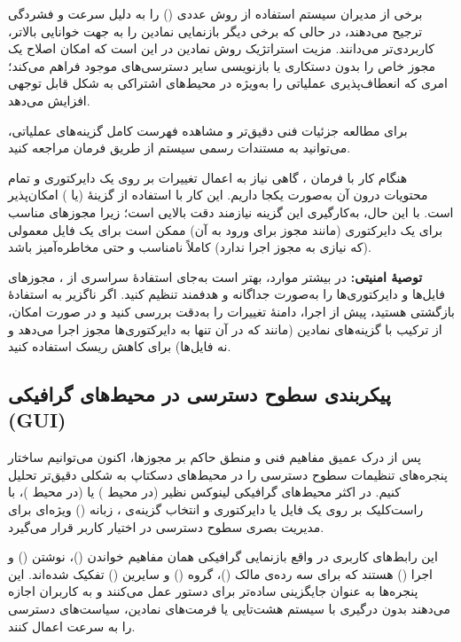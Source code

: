 برخی از مدیران سیستم استفاده از روش عددی () را به دلیل سرعت و فشردگی ترجیح می‌دهند، در حالی که برخی دیگر بازنمایی نمادین را به جهت خوانایی بالاتر، کاربردی‌تر می‌دانند. مزیت استراتژیک روش نمادین در این است که امکان اصلاح یک مجوز خاص را بدون دستکاری یا بازنویسی سایر دسترسی‌های موجود فراهم می‌کند؛ امری که انعطاف‌پذیری عملیاتی را به‌ویژه در محیط‌های اشتراکی به شکل قابل توجهی افزایش می‌دهد.

برای مطالعه جزئیات فنی دقیق‌تر و مشاهده فهرست کامل گزینه‌های عملیاتی، می‌توانید به مستندات رسمی سیستم از طریق فرمان  مراجعه کنید.

هنگام کار با فرمان ، گاهی نیاز به اعمال تغییرات بر روی یک دایرکتوری و تمام محتویات درون آن به‌صورت یکجا داریم. این کار با استفاده از گزینهٔ  (یا ) امکان‌پذیر است. با این حال، به‌کارگیری این گزینه نیازمند دقت بالایی است؛ زیرا مجوزهای مناسب برای یک دایرکتوری (مانند مجوز  برای ورود به آن) ممکن است برای یک فایل معمولی (که نیازی به مجوز اجرا ندارد) کاملاً نامناسب و حتی مخاطره‌آمیز باشد.

\textbf{توصیهٔ امنیتی:} در بیشتر موارد، بهتر است به‌جای استفادهٔ سراسری از ، مجوزهای فایل‌ها و دایرکتوری‌ها را به‌صورت جداگانه و هدفمند تنظیم کنید. اگر ناگزیر به استفادهٔ بازگشتی هستید، پیش از اجرا، دامنهٔ تغییرات را به‌دقت بررسی کنید و در صورت امکان، از ترکیب  با گزینه‌های نمادین (مانند  که در آن  تنها به دایرکتوری‌ها مجوز اجرا می‌دهد و نه فایل‌ها) برای کاهش ریسک استفاده کنید.

\subsection{پیکربندی سطوح دسترسی در محیط‌های گرافیکی (GUI)}

پس از درک عمیق مفاهیم فنی و منطق حاکم بر مجوزها، اکنون می‌توانیم ساختار پنجره‌های تنظیمات سطوح دسترسی را در محیط‌های دسکتاپ به شکلی دقیق‌تر تحلیل کنیم. در اکثر محیط‌های گرافیکی لینوکس نظیر  (در محیط ) یا  (در محیط )، با راست‌کلیک بر روی یک فایل یا دایرکتوری و انتخاب گزینه‌ی ، زبانه () ویژه‌ای برای مدیریت بصری سطوح دسترسی در اختیار کاربر قرار می‌گیرد.

این رابط‌های کاربری در واقع بازنمایی گرافیکی همان مفاهیم خواندن ()، نوشتن () و اجرا () هستند که برای سه رده‌ی مالک ()، گروه () و سایرین () تفکیک شده‌اند. این پنجره‌ها به عنوان جایگزینی ساده‌تر برای دستور  عمل می‌کنند و به کاربران اجازه می‌دهند بدون درگیری با سیستم هشت‌تایی یا فرمت‌های نمادین، سیاست‌های دسترسی را به سرعت اعمال کنند.

